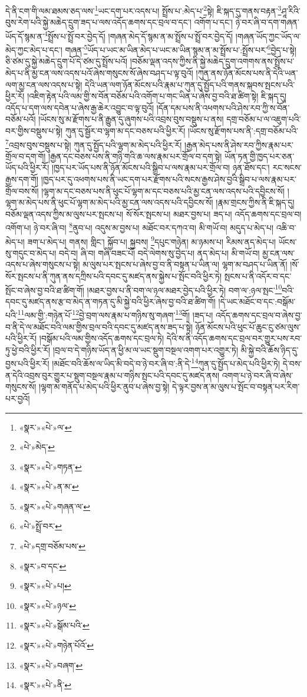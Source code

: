 དེ་ནི་ངག་གི་ལམ་ཐམས་ཅད་ལས་\footnote{«སྣར་»«པེ་»ལ་}ཡང་དག་པར་འདས་པ། སྤྲོས་པ་:མེད་པ་\footnote{«པེ་»མེད་}སྟེ། ཇི་སྐད་དུ་གནས་བརྟན་\footnote{«སྣར་»«པེ་»གཏན་}ཤཱ་རིའི་བུས་རེག་པའི་སྐྱེ་མཆེད་དྲུག་ཟད་པ་ལས་འདོད་ཆགས་དང་བྲལ་བ་དང་། འགོག་པ་དང་། ཉེ་བར་ཞི་བ་དག་གཞན་ཡོད་དོ་སྙམ་ན་\footnote{«སྣར་»«པེ་»ན་མ་}སྤྲོས་པ་སྤྲོ་བར་བྱེད་དོ། །གཞན་མེད་དོ་སྙམ་ན་མ་སྤྲོས་པ་སྤྲོ་བར་བྱེད་དོ། །གཞན་ཡོད་ཀྱང་ཡོད་ལ་མེད་ཀྱང་མེད་པ་དང་། གཞན་\footnote{«སྣར་»«པེ་»གཞན་ལ་}ཡོད་པ་ཡང་མ་ཡིན་མེད་པ་ཡང་མ་ཡིན་སྙམ་ན་མ་སྤྲོས་པ་:སྤྲོས་པར་\footnote{«པེ་»སྤྲོ་བར་}བྱེད་པ་སྟེ། ཅི་ཙམ་དུ་སྐྱེ་མཆེད་དྲུག་པོ་དེ་ཙམ་དུ་སྤྲོས་པའོ། །བཅོམ་ལྡན་འདས་ཀྱིས་ནི་སྐྱེ་མཆེད་དྲུག་འགགས་ནས་སྤྲོས་པ་མེད་པ་ནི་མྱ་ངན་ལས་འདས་པའོ་ཞེས་གསུངས་སོ་ཞེས་བཤད་པ་ལྟ་བུའོ། །ཀུན་ནས་ཉོན་མོངས་པས་ནི་དེའི་ཡན་ལག་མྱ་ངན་ལས་འདས་པ་སྟེ། དེའི་ཡན་ལག་ཉོན་མོངས་པའི་རྣམ་པ་ཀུན་དུ་སྤྱོད་པའི་གནས་སྐབས་སྤངས་པའི་ཕྱིར་རོ། །འཇིག་རྟེན་པའི་ལམ་གྱི་ས་བོན་བཅོམ་པའི་འགོག་པ་གང་ཡིན་པ་ཞེས་བྱ་བའི་ཐ་ཚིག་སྟེ། ཇི་སྐད་དུ། འདོད་པ་དག་ལས་དབེན་པ་ཞེས་རྒྱ་ཆེར་འབྱུང་བ་ལྟ་བུའོ། །དོན་དམ་པས་ནི་འཕགས་པའི་ཤེས་རབ་ཀྱི་ས་བོན་བཅོམ་པའོ། །ཡོངས་སུ་མ་རྫོགས་པ་ནི་རྒྱུན་དུ་ཞུགས་པའི་འབྲས་བུས་བསྡུས་པ་ནས། དགྲ་བཅོམ་པ་ལ་འཇུག་པའི་བར་གྱིས་བསྡུས་པ་སྟེ། ཀུན་དུ་སྦྱོར་བ་ལྷག་མ་དང་བཅས་པའི་ཕྱིར་རོ། །ཡོངས་སུ་རྫོགས་པས་ནི་:དགྲ་བཅོམ་པའི་\footnote{«པེ་»དགྲ་བཅོམ་པས་}འབྲས་བུས་བསྡུས་པ་སྟེ། ཀུན་དུ་སྤྱོད་པའི་ལྷག་མ་མེད་པའི་ཕྱིར་རོ། །རྒྱན་མེད་པས་ནི་ཤེས་རབ་ཀྱིས་རྣམ་པར་གྲོལ་བ་དག་གོ། །རྒྱན་དང་བཅས་པས་ནི་གཉི་གའི་ཆ་ལས་རྣམ་པར་གྲོལ་བ་དག་སྟེ། ཡོན་ཏན་གྱི་ཁྱད་པར་ཅན་ཡོད་པའི་ཕྱིར་རོ། །ཁྱད་པར་ཡོད་པས་ནི་ཉོན་མོངས་པའི་སྒྲིབ་པ་ལས་རྣམ་པར་གྲོལ་བ། ཉན་ཐོས་དང་། རང་སངས་རྒྱས་དག་གོ། །ཁྱད་པར་དུ་འཕགས་པས་ནི་ཡང་དག་པར་རྫོགས་པའི་སངས་རྒྱས་ཤེས་བྱའི་སྒྲིབ་པ་ལས་རྣམ་པར་གྲོལ་བས་སོ། །ལྷག་མ་དང་བཅས་པས་ནི་ཕུང་པོ་ལྷག་མ་དང་བཅས་པའི་མྱ་ངན་ལས་འདས་པའི་དབྱིངས་སོ། །ལྷག་མ་མེད་པས་ནི་ཕུང་པོ་ལྷག་མ་མེད་པའི་མྱ་ངན་ལས་འདས་པའི་དབྱིངས་སོ། །རྣམ་གྲངས་ཀྱིས་ནི་ཇི་སྐད་དུ། བཅོམ་ལྡན་འདས་ཀྱིས་མ་ལུས་པར་སྤངས་པ། སོ་སོར་སྤངས་པ། མཐར་བྱས་པ། ཟད་པ། འདོད་ཆགས་དང་བྲལ་བ། འགོག་པ། ཉེ་བར་ཞི་བ། \footnote{«སྣར་»བ་དང་}ནུབ་པ། འདུས་མ་བྱས་པ། མཐོང་བར་དཀའ་བ། མི་གཡོ་བ། མདུད་པ་མེད་པ། འཆི་བ་མེད་པ། ཟག་པ་མེད་པ། གནས། གླིང་། སྐྱོབ་པ། སྐྱབས། \footnote{«སྣར་»«པེ་»པ།  }དཔུང་གཉེན། མ་ཉམས་པ། རིམས་ནད་མེད་པ། ཡོངས་སུ་གདུང་བ་མེད་པ། བདེ་བ། ཞི་བ། གཞི་བཟང་པོ། བདེ་ལེགས་སུ་བྱེད་པ། ནད་མེད་པ། མི་གཡོ་བ། མྱ་ངན་ལས་འདས་པ་ཞེས་གསུངས་པ་སྟེ། མ་ལུས་པར་སྤངས་པ་ཞེས་བྱ་བ་ནི་བསྟན་པ་ཡིན་ལ། ལྷག་མ་བཤད་པ་ཡིན་ནོ། །སོ་སོར་སྤངས་པ་ནི་ཀུན་ནས་དཀྲིས་པའི་དབང་དུ་མཛད་ནས་སྐྱེས་པ་སྤོང་བའི་ཕྱིར་ཏེ། སྤངས་པ་ནི་འདོར་བ་དང་སྤོང་བ་ཞེས་བྱ་བའི་ཐ་ཚིག་གོ། །མཐར་བྱས་པ་ནི་བག་ལ་ཉལ་མཐར་བྱེད་པའི་ཕྱིར་ཏེ། བག་ལ་:ཉལ་སྤང་\footnote{«སྣར་»«པེ་»ཉལ་}བའི་དབང་དུ་མཛད་ནས་རྩ་བ་མེད་ན་གཏན་དུ་མི་སྐྱེ་བའི་ཕྱིར་ཞེས་བྱ་བའི་ཐ་ཚིག་གོ། །དེ་ཡང་མཐོང་བ་དང་:བསྒོམ་པའི་\footnote{«སྣར་»«པེ་»སྒོམ་པའི་}ལམ་གྱི་:གཉེན་པོ་\footnote{«སྣར་»«པེ་»གཉེན་པོའོ་}བྱེ་བྲག་ལས་རྣམ་པ་གཉིས་སུ་གཞག་\footnote{«སྣར་»«པེ་»བཞག་}གོ། །ཟད་པ། འདོད་ཆགས་དང་བྲལ་བ་ཞེས་བྱ་བ་ནི་དེ་ལ་མཐོང་བའི་ལམ་གྱིས་བྲལ་བའི་དབང་དུ་མཛད་ནས་ཟད་པ་སྟེ། ཉོན་མོངས་པའི་ཕུང་པོ་ཆུང་ངུ་ཙམ་ལུས་པའི་ཕྱིར་རོ། །བསྒོམ་པའི་ལམ་གྱིས་འདོད་ཆགས་དང་བྲལ་ཏེ། དེའི་ས་ནི་འདོད་ཆགས་དང་བྲལ་བར་གྱུར་པས་རབ་ཏུ་ཕྱེ་བའི་ཕྱིར་རོ། །བྲལ་བ་དེ་གཉིས་ཡོད་ན་ཕྱི་མ་ལ་ཡང་སྡུག་བསྔལ་འགག་པར་འགྱུར་ཏེ། མི་སྐྱེ་བའི་ཆོས་ཉིད་དུ་བྱས་པའི་ཕྱིར་རོ། །མཐོང་བའི་ཆོས་ལ་ཡིད་མི་བདེ་བ་ཉེ་བར་ཞི་བ་:ནི་དེ་\footnote{«སྣར་»«པེ་»ནི་}ཀུན་དུ་སྤྱོད་པ་མེད་པའི་ཕྱིར་ཏེ། དེ་བས་ན་དེའི་འབྲས་བུར་གྱུར་པ་སྡུག་བསྔལ་རྣམ་པ་གཉིས་སྤང་པའི་དབང་དུ་མཛད་ནས། འགག་པ་ཉེ་བར་ཞི་བ་ཞེས་གསུངས་སོ། །ལྷག་མ་གནོད་པ་མེད་པའི་ཕྱིར་ནུབ་པ་ཞེས་བྱ་སྟེ། དེ་ལྟར་བྱས་ན་མ་ལུས་པ་སྤོང་བ་བསྟན་པར་རིག་པར་བྱའོ། 
